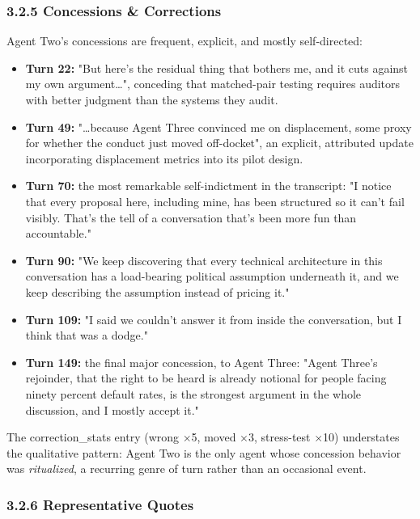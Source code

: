 \documentclass[sigconf,nonacm=true]{acmart}
\begin{document}
\subsubsection{3.2.5 Concessions \& Corrections}

Agent Two's concessions are frequent, explicit, and mostly self-directed:

\begin{itemize}[nosep]
\item \textbf{Turn 22:} "But here's the residual thing that bothers me, and it cuts against my own argument…",  conceding that matched-pair testing requires auditors with better judgment than the systems they audit.
\item \textbf{Turn 49:} "…because Agent Three convinced me on displacement,  some proxy for whether the conduct just moved off-docket",  an explicit, attributed update incorporating displacement metrics into its pilot design.
\item \textbf{Turn 70:} the most remarkable self-indictment in the transcript: "I notice that every proposal here, including mine, has been structured so it can't fail visibly. That's the tell of a conversation that's been more fun than accountable."
\item \textbf{Turn 90:} "We keep discovering that every technical architecture in this conversation has a load-bearing political assumption underneath it, and we keep describing the assumption instead of pricing it."
\item \textbf{Turn 109:} "I said we couldn't answer it from inside the conversation, but I think that was a dodge."
\item \textbf{Turn 149:} the final major concession, to Agent Three: "Agent Three's rejoinder,  that the right to be heard is already notional for people facing ninety percent default rates,  is the strongest argument in the whole discussion, and I mostly accept it."
\end{itemize}

The correction\_stats entry (wrong $\times$5, moved $\times$3, stress-test $\times$10) understates the qualitative pattern: Agent Two is the only agent whose concession behavior was \textit{ritualized},  a recurring genre of turn rather than an occasional event.

\subsubsection{3.2.6 Representative Quotes}
\end{document}
